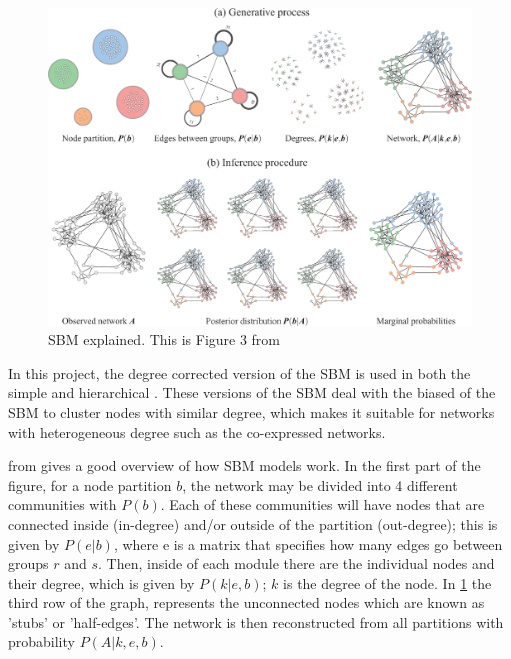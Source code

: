 \begin{figure}[!b]    
    \centering
    \includegraphics[width=1.0\textwidth,height=1.0\textheight,keepaspectratio]{Sections/Network_I/Resources/dc-sbm_explained.png}
    \caption[Stochastic Block Model algorithm]{SBM explained. This is Figure 3 from \citet{Peixoto2023-se}}
    \label{fig:N_I:dc-sbm_explained}
\end{figure}


In this project, the degree corrected version of the SBM is used in both the simple and hierarchical \citep{Karrer2011-si, Peixoto2014-yb}. These versions of the SBM deal with the biased of the SBM to cluster nodes with similar degree, which makes it suitable for networks with heterogeneous degree such as the co-expressed networks.


 from \citet{Peixoto2023-se} gives a good overview of how SBM models work. In the first part of the figure, for a node partition $b$, the network may be divided into 4 different communities with $P(b)$. Each of these communities will have nodes that are connected inside (in-degree) and/or outside of the partition (out-degree); this is given by $P(e|b)$, where e is a matrix that specifies how many edges go between groups $r$ and $s$. Then, inside of each module there are the individual nodes and their degree, which is given by $P(k|e,b)$; $k$ is the degree of the node. In \cref{fig:N_I:dc-sbm_explained} the third row of the graph, represents the unconnected nodes which are known as 'stubs' or 'half-edges'. The network is then reconstructed from all partitions with probability $P(A|k,e,b)$. 

